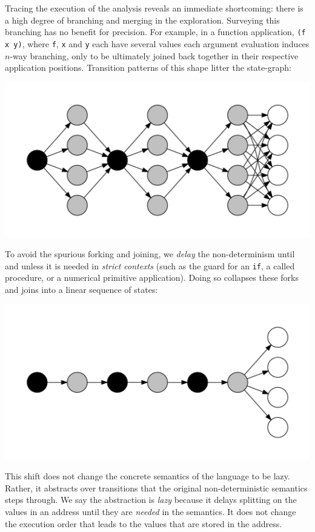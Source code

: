 \documentclass[9pt]{sigplanconf} %
\begin{document}
Tracing the execution of the analysis reveals an immediate shortcoming:
there is a high degree of branching and merging in the exploration.
%
Surveying this branching has no benefit for precision.
%
For example, in a function application, {\tt (f x y)},
where {\tt f}, {\tt x} and {\tt y} each have several values
each argument evaluation induces $n$-way branching, only to be ultimately joined back together in their respective
application positions.
%
Transition patterns of this shape litter the state-graph:
%
\begin{center}
\includegraphics[scale=0.2]{fanoutdot2}
\end{center}
To avoid the spurious forking and joining, we {\it delay} the non-determinism
until and unless it is needed in {\it strict contexts} (such as the guard for an
{\tt if}, a called procedure, or a numerical primitive application).
%
Doing so collapses these forks and joins into a linear sequence of states:
\begin{center}
\includegraphics[scale=0.2]{lazydot}
\end{center}

This shift does not change the concrete semantics of the language to
be lazy.  Rather, it abstracts over transitions that the original
non-deterministic semantics steps through.
%
We say the abstraction is \emph{lazy} because it delays splitting on
the values in an address until they are \emph{needed} in the
semantics. It does not change the execution order that leads to the
values that are stored in the address.
\end{document}
